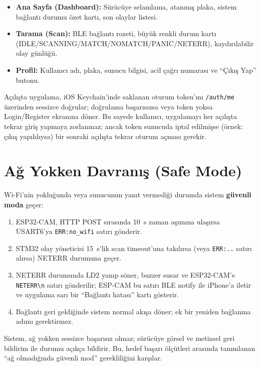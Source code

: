 \begin{itemize}
    \item \textbf{Ana Sayfa (Dashboard):} Sürücüye selamlama, atanmış
          plaka, sistem bağlantı durumu özet kartı, son olaylar listesi.
    \item \textbf{Tarama (Scan):} BLE bağlantı rozeti, büyük renkli durum
          kartı (IDLE/SCANNING/MATCH/NOMATCH/PANIC/NETERR), kaydırılabilir
          olay günlüğü.
    \item \textbf{Profil:} Kullanıcı adı, plaka, sunucu bilgisi, acil
          çağrı numarası ve ``Çıkış Yap'' butonu.
\end{itemize}

Açılışta uygulama, iOS Keychain'inde saklanan oturum token'ını
\texttt{/auth/me} üzerinden sessizce doğrular; doğrulama başarısızsa
veya token yoksa Login/Register ekranına döner. Bu sayede kullanıcı,
uygulamayı her açılışta tekrar giriş yapmaya zorlanmaz; ancak token
sunucuda iptal edilmişse (örnek: çıkış yapıldıysa) bir sonraki
açılışta tekrar oturum açması gerekir.

\section{Ağ Yokken Davranış (Safe Mode)}
\label{sec:safe-mode}

Wi-Fi'nin yokluğunda veya sunucunun yanıt vermediği durumda sistem
\textbf{güvenli moda} geçer:

\begin{enumerate}
    \item ESP32-CAM, HTTP POST sırasında 10~s zaman aşımına ulaşırsa
          USART6'ya \texttt{ERR:no\_wifi} satırı gönderir.
    \item STM32 olay yöneticisi 15~s'lik scan timeout'una takılırsa
          (veya \texttt{ERR:..} satırı alırsa) NETERR durumuna geçer.
    \item NETERR durumunda LD2 yanıp söner, buzzer susar ve ESP32-CAM'e
          \texttt{NETERR\textbackslash n} satırı gönderilir; ESP-CAM bu
          satırı BLE notify ile iPhone'a iletir ve uygulama sarı bir
          ``Bağlantı hatası'' kartı gösterir.
    \item Bağlantı geri geldiğinde sistem normal akışa döner; ek bir
          yeniden bağlanma adımı gerektirmez.
\end{enumerate}

Sistem, ağ yokken sessizce başarısız olmaz; sürücüye görsel ve metinsel
geri bildirim ile durumu açıkça bildirir. Bu, hedef başarı ölçütleri
arasında tanımlanan ``ağ olmadığında güvenli mod'' gerekliliğini
karşılar.

